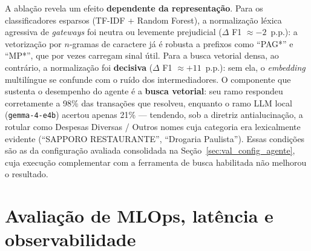 A ablação revela um efeito \textbf{dependente da representação}. Para os classificadores
esparsos (TF-IDF + Random Forest), a normalização léxica agressiva de \textit{gateways} foi
neutra ou levemente prejudicial ($\Delta$ F1 $\approx -2$~p.p.): a vetorização por
$n$-gramas de caractere já é robusta a prefixos como ``PAG*'' e ``MP*'', que por vezes
carregam sinal útil. Para a busca vetorial densa, ao contrário, a normalização foi
\textbf{decisiva} ($\Delta$ F1 $\approx +11$~p.p.): sem ela, o \textit{embedding}
multilíngue se confunde com o ruído dos intermediadores. O componente que sustenta o
desempenho do agente é a \textbf{busca vetorial}: seu ramo respondeu corretamente a
98\% das
transações que resolveu, enquanto o ramo LLM local (\texttt{gemma-4-e4b}) acertou apenas
21\% ---
tendendo, sob a diretriz antialucinação, a rotular como Despesas Diversas / Outros
nomes cuja categoria era lexicalmente evidente (``SAPPORO RESTAURANTE'', ``Drogaria
Paulista''). Essas condições são as da configuração avaliada consolidada na Seção~\ref{sec:val_config_agente}, cuja execução complementar com a ferramenta de busca habilitada não melhorou o resultado.

\section{Avaliação de MLOps, latência e observabilidade}
\label{sec:val_mlops}

